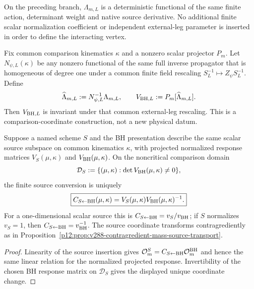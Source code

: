 \documentclass[12pt,a4paper]{article}
\begin{document}
\begin{corollary}
\label{p12:cor:v2123-finite-g16-constructor}
On the preceding branch, $\Lambda_{m,L}$ is a deterministic functional of the
same finite action, determinant weight and native source derivative.  No
additional finite scalar normalization coefficient or independent external-leg
parameter is inserted in order to define the interacting vertex.
\end{corollary}

\begin{definition}
\label{p12:def:v2123-leg-invariant-scalar-response}
Fix common comparison kinematics $\kappa$ and a nonzero scalar projector
$P_m$.  Let $N_{\psi,L}(\kappa)$ be any nonzero functional of the same full
inverse propagator that is homogeneous of degree one under a common finite
field rescaling $S_L^{-1}\mapsto Z_\psi S_L^{-1}$.  Define
\[
 \widehat\Lambda_{m,L}:=N_{\psi,L}^{-1}\Lambda_{m,L},\qquad
 V_{{\rm BH},L}:=P_m[\widehat\Lambda_{m,L}].
\]
Then $V_{{\rm BH},L}$ is invariant under that common external-leg rescaling.
This is a comparison-coordinate construction, not a new physical datum.
\end{definition}

\begin{theorem}
\label{p12:thm:v2123-finite-scheme-comparison-constructor}
Suppose a named scheme $S$ and the BH presentation describe the same scalar
source subspace on common kinematics $\kappa$, with projected normalized
response matrices $V_S(\mu,\kappa)$ and $V_{\rm BH}(\mu,\kappa)$.  On the
noncritical comparison domain
\[
 \mathcal D_S:=\{(\mu,\kappa):\det V_{\rm BH}(\mu,\kappa)\ne0\},
\]
the finite source conversion is uniquely
\[
 \boxed{
 C_{S\leftarrow{\rm BH}}(\mu,\kappa)
 =V_S(\mu,\kappa)V_{\rm BH}(\mu,\kappa)^{-1}.}
\]
For a one-dimensional scalar source this is
$C_{S\leftarrow{\rm BH}}=v_S/v_{\rm BH}$; if $S$ normalizes $v_S=1$, then
$C_{S\leftarrow{\rm BH}}=v_{\rm BH}^{-1}$.  The source coordinate transforms
contragrediently as in Proposition~\ref{p12:prop:v288-contragredient-mass-source-transport}.
\end{theorem}
\begin{proof}
Linearity of the source insertion gives
$\mathcal O_m^S=C_{S\leftarrow{\rm BH}}\mathcal O_m^{\rm BH}$ and hence the
same linear relation for the normalized projected response.  Invertibility
of the chosen BH response matrix on $\mathcal D_S$ gives the displayed unique
coordinate change.
\end{proof}
\end{document}
